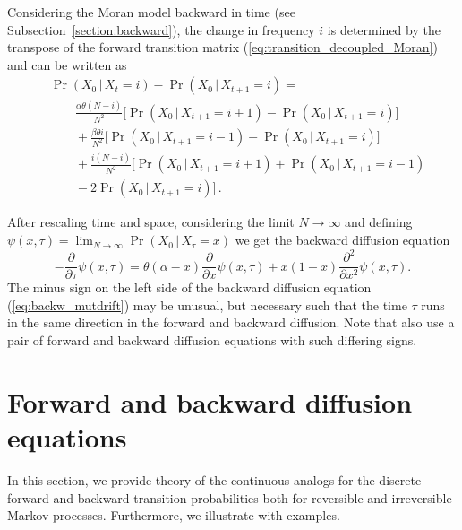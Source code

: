 \documentclass[preprint]{elsarticle}
\newcommand\given{{\,|\,}}
\newcommand\x[1]{\ensuremath{X_{#1}}}
\begin{document}
Considering the Moran model backward in time (see Subsection~\ref{section:backward}), the change in frequency $i$ is determined by the transpose of the forward transition matrix (\ref{eq:transition_decoupled_Moran}) and can be written as
\begin{equation}\label{eq:back_discr_mutation}
\begin{split}
&\Pr(\x{0} \given\x{t}=i)-\Pr(\x{0}\given\x{t+1}=i) = \\
&\qquad \frac{\alpha \theta (N-i)}{N^2} \bigg[\Pr(\x{0}\given\x{t+1}=i+1)-\Pr(\x{0}\given\x{t+1}=i)\bigg]\\
&\qquad+ \frac{\beta \theta i}{N^2} \bigg[\Pr(\x{0}\given\x{t+1}=i-1)-\Pr(\x{0}\given\x{t+1}=i)\bigg]\\
&\qquad+ \frac{i(N-i)}{N^2} \bigg[\Pr(\x{0}\given\x{t+1}=i+1)+\Pr(\x{0}\given\x{t+1}=i-1)\\
&\qquad-2\Pr(\x{0}\given\x{t+1}=i)\bigg]\,.
\end{split}
\end{equation}

After rescaling time and space, considering the limit $N \to \infty$ and defining $\psi(x,\tau)=\lim_{N\to\infty}\Pr(\x{0}\given\x{\tau}=x)$ we get the backward diffusion equation
\begin{equation}\label{eq:backw_mutdrift}
-\frac{\partial}{\partial \tau} \psi(x,\tau) =
    \theta(\alpha-x)\frac{\partial}{\partial x} \psi(x,\tau) +x(1-x)\frac{\partial^2}{\partial x^2}\psi(x,\tau).
\end{equation}
The minus sign on the left side of the backward diffusion equation (\ref{eq:backw_mutdrift}) may be unusual, but necessary such that the time $\tau$ runs in the same direction in the forward and backward diffusion. Note that \citet{Zhao13a} also use a pair of forward and backward diffusion equations with such differing signs.


\section{Forward and backward diffusion equations}\label{forwBackDiff}

In this section, we provide theory of the continuous analogs for the discrete forward and backward transition probabilities both for reversible and irreversible Markov processes. Furthermore, we illustrate with examples.
\end{document}
